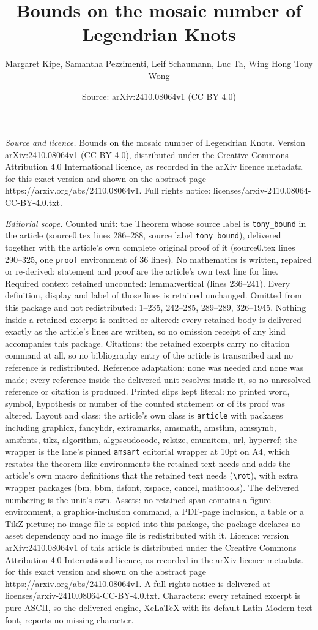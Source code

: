 \documentclass[10pt,a4paper]{amsart}
\title[Bounds on the mosaic number of Legendrian Knots]{Bounds on the mosaic number of Legendrian Knots}
\author{Margaret Kipe, Samantha Pezzimenti, Leif Schaumann, Luc Ta, Wing Hong Tony Wong}
\date{Source: arXiv:2410.08064v1 (CC BY 4.0)}
\begin{document}
\maketitle

\noindent\emph{Source and licence.} Bounds on the mosaic number of Legendrian Knots. Version arXiv:2410.08064v1 (CC BY 4.0), distributed under the Creative Commons Attribution 4.0 International licence, as recorded in the arXiv licence metadata for this exact version and shown on the abstract page https://arxiv.org/abs/2410.08064v1. Full rights notice: licenses/arxiv-2410.08064-CC-BY-4.0.txt.\par\smallskip

\noindent\textit{Editorial scope.} Counted unit: the Theorem whose source label is \texttt{tony\_bound} in the article (source0.tex lines 286--288, source label \texttt{tony\_bound}), delivered together with the article's own complete original proof of it (source0.tex lines 290--325, one \texttt{proof} environment of 36 lines). No mathematics is written, repaired or re-derived: statement and proof are the article's own text line for line. Required context retained uncounted: lemma:vertical (lines 236--241). Every definition, display and label of those lines is retained unchanged. Omitted from this package and not redistributed: 1--235, 242--285, 289--289, 326--1945. Nothing inside a retained excerpt is omitted or altered: every retained body is delivered exactly as the article's lines are written, so no omission receipt of any kind accompanies this package. Citations: the retained excerpts carry no citation command at all, so no bibliography entry of the article is transcribed and no reference is redistributed. Reference adaptation: none was needed and none was made; every reference inside the delivered unit resolves inside it, so no unresolved reference or citation is produced. Printed slips kept literal: no printed word, symbol, hypothesis or number of the counted statement or of its proof was altered. Layout and class: the article's own class is \texttt{article} with packages including graphicx, fancyhdr, extramarks, amsmath, amsthm, amssymb, amsfonts, tikz, algorithm, algpseudocode, relsize, enumitem, url, hyperref; the wrapper is the lane's pinned \texttt{amsart} editorial wrapper at 10pt on A4, which restates the theorem-like environments the retained text needs and adds the article's own macro definitions that the retained text needs (\texttt{\textbackslash rot}), with extra wrapper packages (bm, bbm, dsfont, xspace, cancel, mathtools). The delivered numbering is the unit's own. Assets: no retained span contains a figure environment, a graphics-inclusion command, a PDF-page inclusion, a table or a TikZ picture; no image file is copied into this package, the package declares no asset dependency and no image file is redistributed with it. Licence: version arXiv:2410.08064v1 of this article is distributed under the Creative Commons Attribution 4.0 International licence, as recorded in the arXiv licence metadata for this exact version and shown on the abstract page https://arxiv.org/abs/2410.08064v1. A full rights notice is delivered at licenses/arxiv-2410.08064-CC-BY-4.0.txt. Characters: every retained excerpt is pure ASCII, so the delivered engine, XeLaTeX with its default Latin Modern text font, reports no missing character.
\end{document}
